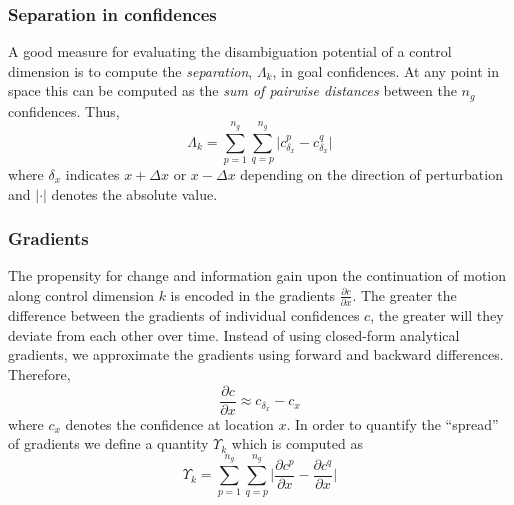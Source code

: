 \documentclass[conference]{IEEEtran}
\begin{document}
\subsubsection{Separation in confidences}
A good measure for evaluating the disambiguation potential of a control dimension is to compute the \textit{separation}, $\Lambda_{k}$, in goal confidences. At any point in space this can be computed as the \textit{sum of pairwise distances} between the $n_g$ confidences.  Thus,
\begin{equation*}
\Lambda_{k} = \sum_{p=1}^{n_g}\sum_{q=p}^{n_g}\lvert c^{p}_{\delta_x} - c^{q}_{\delta_x}\rvert
\end{equation*}
where $\delta_x$ indicates $x+\Delta x$ or $x-\Delta x$ depending on the direction of perturbation and $\lvert\cdot\rvert$ denotes the absolute value.
\subsubsection{Gradients}\label{COMP4}
The propensity for change and information gain upon the continuation of motion along control dimension $k$ is encoded in the gradients $\frac{\partial c}{\partial x}$. The greater the difference between the gradients of individual confidences $c$, the greater will they deviate from each other over time.  Instead of using closed-form analytical gradients, we approximate the gradients using forward and backward differences. Therefore, 
\begin{equation*}
\frac{\partial c}{\partial x} \approx c_{\delta_x} - c_{x} 
\end{equation*}
where $c_x$ denotes the confidence at location $x$.
In order to quantify the ``spread'' of gradients we define a quantity $\Upsilon_{k}$ which is computed as 
\begin{equation*}
\Upsilon_{k} = \sum_{p=1}^{n_g}\sum_{q=p}^{n_g}\Big \lvert\frac{\partial c^p}{\partial x} - \frac{\partial c^q}{\partial x}\Big \rvert
\end{equation*}
\end{document}
